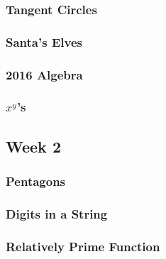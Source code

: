 \documentclass[titlepage=true]{scrartcl}
\begin{document}
        \subsubsection{Tangent Circles}
            \label{5-1-4}
            
        \newpage

        \subsubsection{Santa's Elves}
            \label{5-1-5}
            
        \newpage

        \subsubsection{2016 Algebra}
            \label{5-1-6}
            
        \newpage

        \subsubsection{\(x^y\)'s}
            \label{5-1-7}
            
        \newpage
    
    \subsection{Week 2}

        \subsubsection{Pentagons}
            \label{5-2-1}
            
        \newpage

        \subsubsection{Digits in a String}
            \label{5-2-2}
            
        \newpage

        \subsubsection{Relatively Prime Function}
            \label{5-2-3}
            
        \newpage
\end{document}

